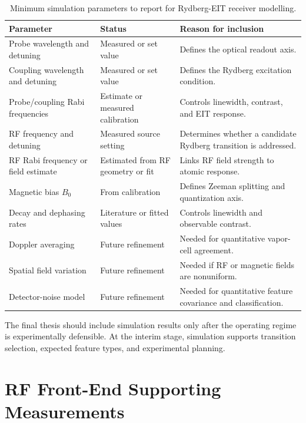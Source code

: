 \documentclass{ieeeaccess}
\begin{document}
\begin{table}[!t]
\caption{Minimum simulation parameters to report for Rydberg-EIT receiver modelling.}
\label{tab:annex_simulation_parameters}
\centering
\renewcommand{\arraystretch}{1.12}
\scriptsize
\begin{tabular}{p{} p{} p{}}
\hline
\textbf{Parameter} & \textbf{Status} & \textbf{Reason for inclusion} \\
\hline
Probe wavelength and detuning & Measured or set value & Defines the optical readout axis. \\
Coupling wavelength and detuning & Measured or set value & Defines the Rydberg excitation condition. \\
Probe/coupling Rabi frequencies & Estimate or measured calibration & Controls linewidth, contrast, and EIT response. \\
RF frequency and detuning & Measured source setting & Determines whether a candidate Rydberg transition is addressed. \\
RF Rabi frequency or field estimate & Estimated from RF geometry or fit & Links RF field strength to atomic response. \\
Magnetic bias \(B_0\) & From calibration & Defines Zeeman splitting and quantization axis. \\
Decay and dephasing rates & Literature or fitted values & Controls linewidth and observable contrast. \\
Doppler averaging & Future refinement & Needed for quantitative vapor-cell agreement. \\
Spatial field variation & Future refinement & Needed if RF or magnetic fields are nonuniform. \\
Detector-noise model & Future refinement & Needed for quantitative feature covariance and classification. \\
\hline
\end{tabular}
\end{table}

The final thesis should include simulation results only after the operating regime is experimentally defensible. At the interim stage, simulation supports transition selection, expected feature types, and experimental planning.

\section{RF Front-End Supporting Measurements}
\label{annex:rf_support}
\end{document}
